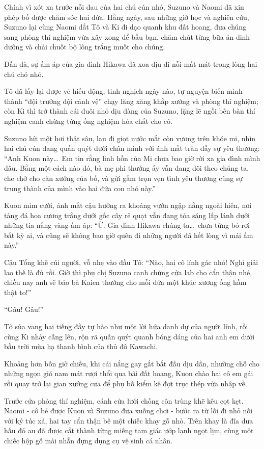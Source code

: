 \documentclass[../main.tex]{subfiles}
\begin{document}
Chính vì xót xa trước nỗi đau của hai chú cún nhỏ, Suzuno và Naomi đã xin phép bố được chăm sóc hai đứa. Hằng ngày, sau những giờ học và nghiên cứu, Suzuno lại cùng Naomi dắt Tô và Ki đi dạo quanh khu đất hoang, đưa chúng sang phòng thí nghiệm vừa xây xong để bầu bạn, chăm chút từng bữa ăn dinh dưỡng và chải chuốt bộ lông trắng muốt cho chúng.

Dần dà, sự ấm áp của gia đình Hikawa đã xoa dịu đi nỗi mất mát trong lòng hai chú chó nhỏ.

Tô đã lấy lại được vẻ hiếu động, tinh nghịch ngày nào, tự nguyện biến mình thành ``đội trưởng đội cảnh vệ'' chạy lăng xăng khắp xưởng và phòng thí nghiệm; còn Ki thì trở thành cái đuôi nhỏ dịu dàng của Suzuno, lặng lẽ ngồi bên bàn thí nghiệm canh chừng từng ống nghiệm hóa chất cho cô.

Suzuno hít một hơi thật sâu, lau đi giọt nước mắt còn vương trên khóe mi, nhìn hai chú cún đang quấn quýt dưới chân mình với ánh mắt tràn đầy sự yêu thương: ``Anh Kuon này\dots\ Em tin rằng linh hồn của Mi chưa bao giờ rời xa gia đình mình đâu. Bằng một cách nào đó, bà mẹ phi thường ấy vẫn đang dõi theo chúng ta, che chở cho căn xưởng của bố, và gửi gắm trọn vẹn tình yêu thương cùng sự trung thành của mình vào hai đứa con nhỏ này.''

Kuon mỉm cười, ánh mắt cậu hướng ra khoảng vườn ngập nắng ngoài hiên, nơi tảng đá hoa cương trắng dưới gốc cây rẻ quạt vẫn đang tỏa sáng lấp lánh dưới những tia nắng vàng ấm áp: ``Ừ. Gia đình Hikawa chúng ta\dots\ chưa từng bỏ rơi bất kỳ ai, và cũng sẽ không bao giờ quên đi những người đã hết lòng vì mái ấm này.''

Cậu Tổng khẽ cúi người, vỗ nhẹ vào đầu Tô: ``Nào, hai cô lính gác nhỏ! Nghỉ giải lao thế là đủ rồi. Giờ thì phụ chị Suzuno canh chừng cửa lab cho cẩn thận nhé, chiều nay anh sẽ bảo bà Kaien thưởng cho mỗi đứa một khúc xương ống hầm thật to!''

``Gâu! Gâu!''

Tô sủa vang hai tiếng đầy tự hào như một lời hứa danh dự của người lính, rồi cùng Ki nhảy cẫng lên, rộn rã quấn quýt quanh bóng dáng của hai anh em dưới bầu trời mùa hạ thanh bình của thủ đô Kawachi.

\ct

Khoảng hơn bốn giờ chiều, khi cái nắng gay gắt bắt đầu dịu dần, nhường chỗ cho những ngọn gió nam mát rượi thổi qua bãi đất hoang, Kuon chào hai cô em gái rồi quay trở lại gian xưởng cưa để phụ bố kiểm kê đợt trục thép vừa nhập về.

Trước cửa phòng thí nghiệm, cánh cửa lưới chống côn trùng khẽ kêu cọt kẹt. Naomi - cô bé được Kuon và Suzuno đưa xuống chơi - bước ra từ lối đi nhỏ nối với ký túc xá, hai tay cẩn thận bê một chiếc khay gỗ nhỏ. Trên khay là đĩa dưa hấu đỏ au đã được cắt thành từng miếng tam giác ướp lạnh ngọt lịm, cùng một chiếc hộp gỗ mài nhẵn đựng dụng cụ vệ sinh cá nhân.
\end{document}
